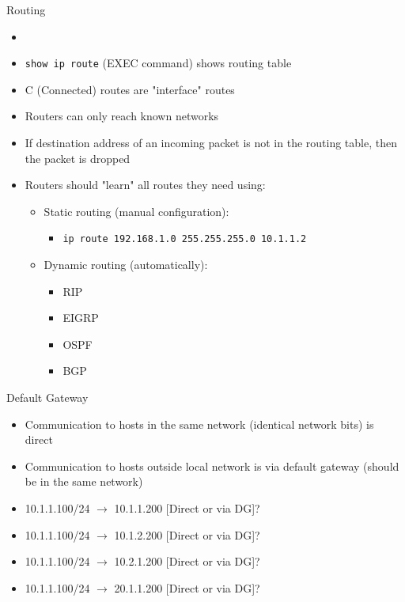\begin{frame}{Routing}
	\begin{itemize}[<+->]
		\item {}
		\item \texttt{show ip route} (EXEC command) shows routing table
		\item C (Connected) routes are "interface" routes
		\item Routers can only reach known networks
		\item If destination address of an incoming packet is not in the routing table, then the packet is dropped
		\item Routers should "learn" all routes they need using:
		\begin{itemize}
			\item Static routing (manual configuration):
			\begin{itemize}
				\item \texttt{ip route 192.168.1.0 255.255.255.0 10.1.1.2}
			\end{itemize}
			\item Dynamic routing (automatically):
			\begin{itemize}
				\item RIP
				\item EIGRP
				\item OSPF
				\item BGP
			\end{itemize}
		\end{itemize}
	\end{itemize}
\end{frame}

\begin{frame}{Default Gateway}
	\begin{itemize}[<+->]
		\item Communication to hosts in the same network (identical network bits) is direct
		\item Communication to hosts outside local network is via default gateway (should be in the same network)
		\item 10.1.1.100/24 $\rightarrow$ 10.1.1.200 [Direct or via DG]?
		\item 10.1.1.100/24 $\rightarrow$ 10.1.2.200 [Direct or via DG]?
		\item 10.1.1.100/24 $\rightarrow$ 10.2.1.200 [Direct or via DG]?
		\item 10.1.1.100/24 $\rightarrow$ 20.1.1.200 [Direct or via DG]?
	\end{itemize}
\end{frame}
